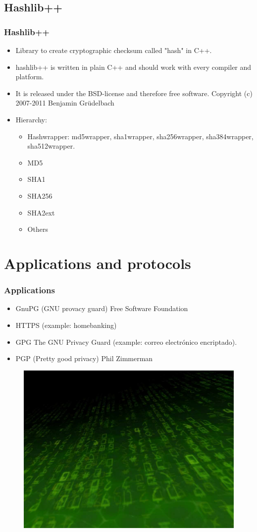 \documentclass{beamer}
\begin{document}
\subsection{Hashlib++}
\begin{frame}
\frametitle{Hashlib++}
\begin{itemize}
\item Library to create cryptographic checksum called "hash" in C++. 
\item hashlib++ is written in plain C++ and should work with every compiler and platform. 
\item It is released under the BSD-license and therefore free software. Copyright (c) 2007-2011 Benjamin Grüdelbach
\item Hierarchy:
\begin{itemize}
\item Hashwrapper: md5wrapper, sha1wrapper, sha256wrapper, sha384wrapper, sha512wrapper.
\item MD5
\item SHA1
\item SHA256
\item SHA2ext
\item Others
\end{itemize}
\end{itemize}
\end{frame}

\section{Applications and protocols}

\begin{frame}
\frametitle{Applications}
\begin{itemize}
\item GnuPG (GNU provacy guard) Free Software Foundation
\item HTTPS (example: homebanking)
\item GPG The GNU Privacy Guard (example: correo electrónico encriptado).
\item PGP (Pretty good privacy) Phil Zimmerman
\end{itemize}
\begin{figure}
\includegraphics[width=0.4\linewidth]{pgp.png}
\end{figure}
\end{frame}
\end{document}
